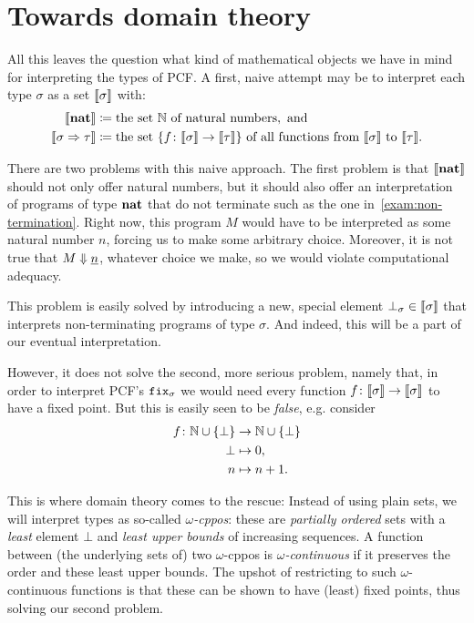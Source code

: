 \section{Towards domain theory}

All this leaves the question what kind of mathematical objects we have in mind
for interpreting the types of PCF. A first, naive attempt may be to interpret
each type \(\sigma\) as a set \(\llbracket\sigma\rrbracket\) with:
\begin{align*}
  \llbracket\mathtt{\mathbf{nat}}\rrbracket &\coloneqq \text{the set \(\mathbb N\) of natural numbers}, \text{ and} \\
  \llbracket\sigma \Rightarrow \tau\rrbracket &\coloneqq \text{the set \(\{f \colon \llbracket\sigma\rrbracket \to
    \llbracket\tau\rrbracket\}\) of all functions from \(\llbracket\sigma\rrbracket\) to \(\llbracket\tau\rrbracket\)}.
\end{align*}

There are two problems with this naive approach.
%
The first problem is that \(\llbracket\mathtt{\mathbf{nat}}\rrbracket\) should not only offer natural
numbers, but it should also offer an interpretation of programs of type
\(\mathtt{\mathbf{nat}}\) that do not terminate such as the one
in~\cref{exam:non-termination}.
%
Right now, this program \(M\) would have to be interpreted as some natural
number \(n\), forcing us to make some arbitrary choice. Moreover, it is not true
that \(M \Downarrow \underline{n}\), whatever choice we make, so we would violate
computational adequacy.

This problem is easily solved by introducing a new, special element
\(\bot_\sigma \in \llbracket\sigma\rrbracket\) that interprets non-terminating programs
of type \(\sigma\). And indeed, this will be a part of our eventual interpretation.

However, it does not solve the second, more serious problem, namely that, in
order to interpret PCF's \(\operatorname{\mathtt{fix}}_\sigma\) we would need every function
\(f \colon \llbracket\sigma\rrbracket \to \llbracket\sigma\rrbracket\) to have a fixed point.
%
But this is easily seen to be \emph{false}, e.g. consider
\begin{align*}
  f \colon \mathbb N \cup \{\bot\} &\to \mathbb N \cup \{\bot\} \\
  \bot &\mapsto 0, \\
  n &\mapsto n+1.
\end{align*}

This is where domain theory comes to the rescue: Instead of using plain sets, we
will interpret types as so-called \emph{\(\omega\)-cppos}: these are
\emph{partially ordered} sets with a \emph{least} element \(\bot\) and
\emph{least upper bounds} of increasing sequences.
%
A function between (the underlying sets of) two \(\omega\)-cppos is
\emph{\(\omega\)-continuous} if it preserves the order and these least upper
bounds.
%
The upshot of restricting to such \(\omega\)-continuous functions is that these
can be shown to have (least) fixed points, thus solving our second problem.

